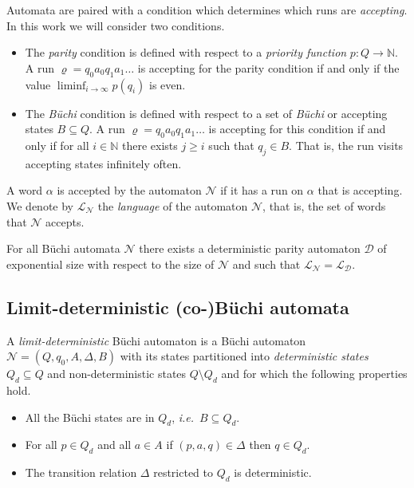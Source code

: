 \documentclass[draft]{llncs}
\let\rho\varrho
\newcommand{\ie}{\textit{i.e.}\xspace}
\newcommand{\calN}{\mathcal{N}}
\newcommand{\calD}{\mathcal{D}}
\newcommand{\lang}[1]{\mathcal{L}_{#1}}
\begin{document}
Automata are paired with a condition which determines which runs are
\emph{accepting}. In this work we will consider two conditions.
\begin{itemize}
    \item The \emph{parity} condition is defined with respect to a
        \emph{priority function} $p : Q \to \mathbb{N}$. A run $\rho = q_0 a_0
        q_1 a_1 \dots$ is accepting for the parity condition if and only if the
        value $\liminf_{i \to \infty} p(q_i)$ is even.
    \item The \emph{B\"uchi} condition is defined with respect to a set of
        \emph{B\"uchi} or accepting states $B \subseteq Q$. A run $\rho = q_0
        a_0 q_1 a_1 \dots$ is accepting for this condition if and only if for
        all $i \in \mathbb{N}$ there exists $j \ge i$ such that $q_j \in B$.
        That is, the run visits accepting states infinitely often.
\end{itemize}
A word $\alpha$ is accepted by the automaton $\calN$ if it has a run on
$\alpha$ that is accepting.  We denote by $\lang{\calN}$ the \emph{language} of
the automaton $\calN$, that is, the set of words that $\calN$ accepts.

\begin{proposition}
    For all B\"uchi automata $\calN$ there exists a deterministic parity
    automaton $\calD$ of exponential size with respect to the size of $\calN$
    and such that $\lang{\calN} = \lang{\calD}$.
\end{proposition}

\subsection{Limit-deterministic (co-)B\"uchi automata}
\begin{definition}
    A \emph{limit-deterministic} B\"uchi automaton is a B\"uchi automaton $\calN
    = (Q,q_0,A,\Delta,B)$ with its states partitioned into \emph{deterministic
    states} $Q_d \subseteq Q$ and non-deterministic states $Q \setminus Q_d$ and
    for which the following properties hold.
    \begin{itemize}
        \item All the B\"uchi states are in $Q_d$, \ie~$B \subseteq Q_d$.
        \item For all $p \in Q_d$ and all $a \in A$ if $(p,a,q) \in \Delta$ then
            $q \in Q_d$.
        \item The transition relation $\Delta$ restricted to $Q_d$ is
            deterministic.
    \end{itemize}
\end{definition}
\end{document}
